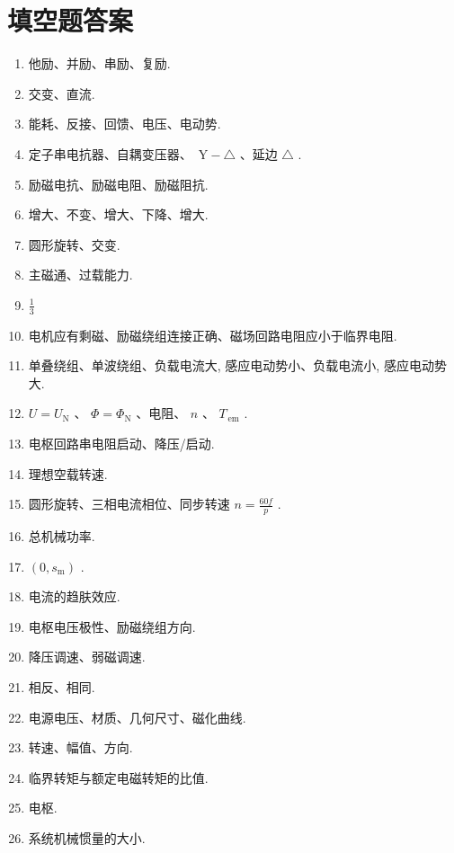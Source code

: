 \documentclass[lang=cn,11pt,marginpar=margintrue]{elegantbook}%
\newcommand{\zt}[1]{\,\mathrm{#1}}
\newcommand{\NN}{\mathrm{N}}
\begin{document}
\section{填空题答案}
\begin{enumerate}
	\item \label{tk:1}他励、并励、串励、复励.
	\item \label{tk:2}交变、直流.
	\item \label{tk:3}能耗、反接、回馈、电压、电动势.
	\item \label{tk:4}定子串电抗器、自耦变压器、 $\zt{Y}-\triangle$ 、延边 $\triangle$ .
	\item \label{tk:5}励磁电抗、励磁电阻、励磁阻抗.
	\item \label{tk:6}增大、不变、增大、下降、增大.
	\item \label{tk:7}圆形旋转、交变.
	\item \label{tk:8}主磁通、过载能力.
	\item \label{tk:9} $\frac{1}{3}$
	\item \label{tk:10}电机应有剩磁、励磁绕组连接正确、磁场回路电阻应小于临界电阻.
	\item \label{tk:11}单叠绕组、单波绕组、负载电流大, 感应电动势小、负载电流小, 感应电动势大.
	\item \label{tk:12} $U=U_{\NN}$ 、 $\varPhi=\varPhi_{\NN}$ 、电阻、 $n$ 、 $T_{\zt{em}}$ .
	\item \label{tk:13}电枢回路串电阻启动、降压/启动.
	\item \label{tk:14}理想空载转速.
	\item \label{tk:15}圆形旋转、三相电流相位、同步转速 $n=\frac{60f}{p}$ .
	\item \label{tk:16}总机械功率.
	\item \label{tk:17} $(0,s_{\mathrm{m}})$ .
	\item \label{tk:18}电流的趋肤效应.
	\item \label{tk:19}电枢电压极性、励磁绕组方向.
	\item \label{tk:20}降压调速、弱磁调速.
	\item \label{tk:21}相反、相同.
	\item \label{tk:22}电源电压、材质、几何尺寸、磁化曲线.
	\item \label{tk:23}转速、幅值、方向.
	\item \label{tk:24}临界转矩与额定电磁转矩的比值.
	\item \label{tk:25}电枢.
	\item \label{tk:26}系统机械惯量的大小.

\end{enumerate}
\end{document}
